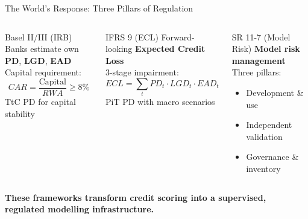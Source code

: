 \documentclass[aspectratio=169,11pt]{beamer}
\newcommand{\B}[1]{\textbf{#1}}
\newcommand{\hl}[1]{\textcolor{itcblue}{\textbf{#1}}}
\begin{document}
\begin{frame}{The World's Response: Three Pillars of Regulation}
  \begin{columns}[T]
      \begin{block}{Basel II/III (IRB)}\small
        Banks estimate own \B{PD}, \B{LGD}, \B{EAD}\\[2pt]
        Capital requirement:
        \vspace{-4pt}\[CAR = \frac{\text{Capital}}{RWA} \geq 8\%\]\vspace{-4pt}
        TtC PD for capital stability
      \end{block}

      \begin{block}{IFRS 9 (ECL)}\small
        Forward-looking \B{Expected Credit Loss}\\[2pt]
        3-stage impairment:
        \vspace{-4pt}\[ECL = \sum_t PD_t \cdot LGD_t \cdot EAD_t\]\vspace{-4pt}
        PiT PD with macro scenarios
      \end{block}

      \begin{block}{SR 11-7 (Model Risk)}\small
        \B{Model risk management}\\[2pt]
        Three pillars:
        \begin{itemize}\footnotesize
          \item Development \& use
          \item Independent validation
          \item Governance \& inventory
        \end{itemize}
      \end{block}
  \end{columns}
  \vspace{6pt}
  \begin{center}
    \hl{These frameworks transform credit scoring into a supervised, regulated modelling infrastructure.}
  \end{center}
\end{frame}
\end{document}

